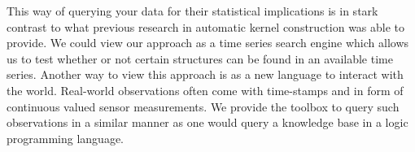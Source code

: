 This way of querying your data for their statistical implications is in stark contrast to what previous research in automatic kernel construction was able to provide.
We could view our approach as a time series search engine which allows us to test whether or not certain structures can be found
in an available time series.
Another way to view this approach is as a new language to interact with the world.
Real-world observations often come with time-stamps and in form
of continuous valued sensor measurements.  
We provide the toolbox to query such observations in a similar manner as
one would query a knowledge base in a logic programming language.






